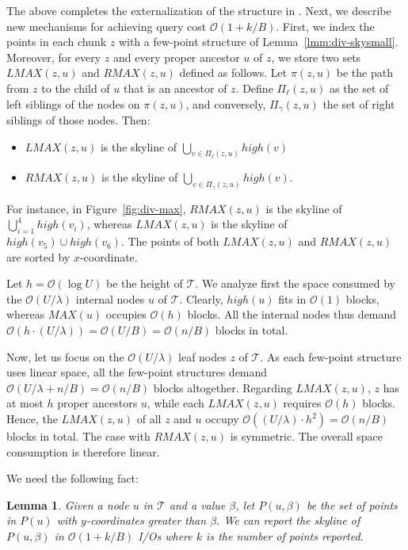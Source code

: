 \documentclass{sig-alternate}
\newtheorem{lemma}{Lemma}
\def\extraspacing{\vspace{2mm} \noindent}
\def\high{\mathit{high}}
\def\MAX{\mathit{MAX}}
\def\lmax{\mathit{LMAX}}
\def\rmax{\mathit{RMAX}}
\def\T{\mathcal{T}}
\newcommand{\bigO}{\mathcal{O}}
\renewcommand{\(}{\left(}
\renewcommand{\)}{\right)}
\begin{document}
\begin{fullenv}
The above completes the externalization of the structure in \cite{BT11}. Next,
we describe new mechanisms for achieving query cost $\bigO(1 + k/B)$. First, we
index the points in each chunk $z$ with a few-point structure of
Lemma~\ref{lmm:div-skysmall}. Moreover, for every $z$ and every proper ancestor $u$ of $z$, we store two sets $\lmax(z, u)$ and $\rmax(z, u)$ defined as follows. Let
$\pi(z, u)$ be the path from $z$ to the child of $u$ that is an ancestor of
$z$. Define $\Pi_\ell(z, u)$ as the set of left siblings of the nodes on
$\pi(z, u)$, and conversely, $\Pi_\gamma(z, u)$ the set of right siblings of
those nodes. Then:
\begin{itemize}
  \item $\lmax(z, u)$ is the skyline of $\bigcup_{v \in \Pi_\ell(z, u)}
      \high(v)$
  \item $\rmax(z, u)$ is the skyline of $\bigcup_{v \in \Pi_\gamma(z, u)}
    \high(v)$.
\end{itemize}
For instance, in Figure~\ref{fig:div-max}, $RMAX(z, u)$ is the skyline of $\bigcup_{i=1}^4 \high(v_i)$, whereas $LMAX(z, u)$ is the skyline of $\high(v_5) \cup \high(v_6)$. The points of both $\lmax(z, u)$ and $\rmax(z, u)$ are sorted by $x$-coordinate.

\extraspacing {\bf Space.} Let $h = \bigO(\log U)$ be the height of $\T$. We
analyze first the space consumed by the $\bigO(U/\lambda)$ internal nodes $u$
of $\T$. Clearly, $\high(u)$ fits in $\bigO(1)$ blocks, whereas $\MAX(u)$ occupies
$\bigO(h)$ blocks. All the internal nodes thus demand $\bigO(h \cdot (U /
\lambda)) = \bigO(U/B) = \bigO(n/B)$ blocks in total.

Now, let us focus on the $\bigO(U/\lambda)$ leaf nodes $z$ of $\T$. As each
few-point structure uses linear space, all the few-point structures demand
$\bigO(U/\lambda + n/B) = \bigO(n/B)$ blocks altogether. Regarding $\lmax(z,
u)$, $z$ has at most $h$ proper ancestors $u$, while each $\lmax(z, u)$
requires $\bigO(h)$ blocks. Hence, the $\lmax(z, u)$ of all $z$ and $u$ occupy
$\bigO((U/\lambda) \cdot h^2) = \bigO(n/B)$ blocks in total. The case with
$\rmax(z, u)$ is symmetric. The overall space consumption is therefore linear.

\extraspacing {\bf Query.} We need the following fact:

\begin{lemma} \label{lmm:div-half}
  Given a node $u$ in $\T$ and a value $\beta$, let $P(u, \beta)$ be the set of
  points in $P(u)$ with $y$-coordinates greater than $\beta$. We can report the skyline of
  $P(u, \beta)$ in $\bigO(1 + k/B)$ I/Os where $k$ is the number of points reported.
\end{lemma}


\end{fullenv}
\end{document}
